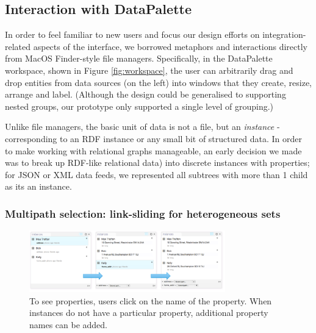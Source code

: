 \documentclass{sigchi}
\begin{document}
\subsection{Interaction with DataPalette}
In order to feel familiar to new users and focus our design efforts on integration-related aspects of the interface, we borrowed metaphors and interactions directly from MacOS Finder-style file managers.  Specifically, in the DataPalette workspace, shown in Figure \ref{fig:workspace}, the user can arbitrarily drag and drop entities from data sources (on the left) into windows that they create, resize, arrange and label. (Although the design could be generalised to supporting nested groups, our prototype only supported a single level of grouping.)

Unlike file managers, the basic unit of data is not a file, but an \emph{instance} - corresponding to an RDF instance or any small bit of structured data. In order to make working with relational graphs manageable, an early decision we made was to break up RDF-like relational data) into discrete instances with properties; for JSON or XML data feeds, we represented all subtrees with more than 1 child as its an instance.  

\subsubsection{Multipath selection: link-sliding for heterogeneous sets}

\begin{figure}[htbp]
\begin{center}
\includegraphics[width=8.5cm]{img/multipathing}
\caption{To see properties, users click on the name of the property. When instances do not have a particular property, additional property names can be added.}
\label{fig:multipathing}
\end{center}
\end{figure}
\end{document}
